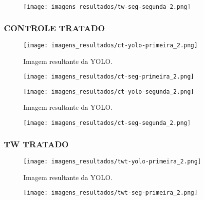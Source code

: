 \begin{figure}[!h]
    \centering
    \texttt{[image: imagens\_resultados/tw-seg-segunda\_2.png]}
    \caption{}
    \label{fig:tw-seg-segunda_2}
\end{figure}

\subsubsection{CONTROLE TRATADO}

\begin{figure}[!h]
    \centering
    \texttt{[image: imagens\_resultados/ct-yolo-primeira\_2.png]}
    \caption{Imagem resultante da YOLO.}
    \label{fig:ct-yolo-primeira_2}
\end{figure}

\begin{figure}[!h]
    \centering
    \texttt{[image: imagens\_resultados/ct-seg-primeira\_2.png]}
    \caption{}
    \label{fig:ct-seg-primeira_2}
\end{figure}

\begin{figure}[!h]
    \centering
    \texttt{[image: imagens\_resultados/ct-yolo-segunda\_2.png]}
    \caption{Imagem resultante da YOLO.}
    \label{fig:ct-yolo-segunda_2}
\end{figure}

\begin{figure}[!h]
    \centering
    \texttt{[image: imagens\_resultados/ct-seg-segunda\_2.png]}
    \caption{}
    \label{fig:ct-seg-segunda_2}
\end{figure}

\subsubsection{TW TRATADO}

\begin{figure}[!h]
    \centering
    \texttt{[image: imagens\_resultados/twt-yolo-primeira\_2.png]}
    \caption{Imagem resultante da YOLO.}
    \label{fig:twt-yolo-primeira_2}
\end{figure}

\begin{figure}[!h]
    \centering
    \texttt{[image: imagens\_resultados/twt-seg-primeira\_2.png]}
    \caption{}
    \label{fig:twt-seg-primeira_2}
\end{figure}

